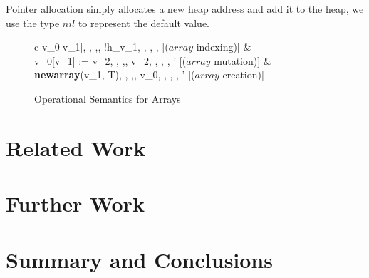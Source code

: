 \documentclass[a4paper,12pt]{report}
\begin{document}
\par
Pointer allocation simply allocates a new heap address and add it to the heap, 
we use the type $nil$ to represent the default value. 


\begin{figure}[H]
  \begin{center}
    \begin{tabular} {c}
        {\langle v_0[v_1], \sigma, \rho,\tau,\Delta \rangle 
          \longrightarrow \langle !h_{v_1}, \sigma, \rho, \tau, \Delta \rangle} [($array$ indexing)]
      & \\
        {\langle v_0[v_1] := v_2, \sigma, \rho,\tau,\Delta \rangle 
          \longrightarrow \langle v_2, \sigma, \rho, \tau, \Delta' \rangle} [($array$ mutation)]
     & \\
        {\langle \textbf{newarray}(v_1, T), \sigma, \rho,\tau,\Delta \rangle 
          \longrightarrow \langle v_0, \sigma, \rho, \tau, \Delta' \rangle} [($array$ creation)]
    \end{tabular}
  \end{center}
  \caption{Operational Semantics for Arrays}
\end{figure}





\chapter{Related Work}

\chapter{Further Work}

\chapter{Summary and Conclusions} 


\appendix
\singlespacing

\printbibliography
\end{document}

